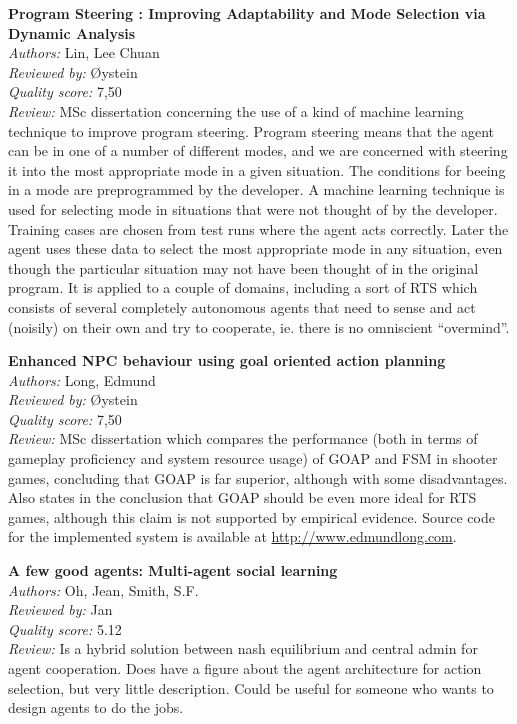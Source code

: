 {\textbf{Program Steering : Improving Adaptability and Mode Selection via Dynamic Analysis\cite{lin2004program}}\\
\textit{Authors:} Lin, Lee Chuan\\
\textit{Reviewed by:} {\O}ystein\\
\textit{Quality score:} 7,50\\
\textit{Review:} MSc dissertation concerning the use of a kind of machine learning technique to improve program steering. Program steering means that the agent can be in one of a number of different modes, and we are concerned with steering it into the most appropriate mode in a given situation. The conditions for beeing in a mode are preprogrammed by the developer. A machine learning technique is used for selecting mode in situations that were not thought of by the developer. Training cases are chosen from test runs where the agent acts correctly. Later the agent uses these data to select the most appropriate mode in any situation, even though the particular situation may not have been thought of in the original program. It is applied to a couple of domains, including a sort of RTS which consists of several completely autonomous agents that need to sense and act (noisily) on their own and try to cooperate, ie. there is no omniscient ``overmind''.

\textbf{Enhanced NPC behaviour using goal oriented action planning\cite{long2007enhanced}}\\
\textit{Authors:} Long, Edmund\\
\textit{Reviewed by:} {\O}ystein\\
\textit{Quality score:} 7,50\\
\textit{Review:} MSc dissertation which compares the performance (both in terms of gameplay proficiency and system resource usage) of GOAP and FSM in shooter games, concluding that GOAP is far superior, although with some disadvantages. Also states in the conclusion that GOAP should be even more ideal for RTS games, although this claim is not supported by empirical evidence. Source code for the implemented system is available at \url{http://www.edmundlong.com}.


\textbf{A few good agents: Multi-agent social learning\cite{Oh2008}}\\
\textit{Authors:} Oh, Jean, Smith, S.F.\\
\textit{Reviewed by:} Jan\\
\textit{Quality score:} 5.12\\
\textit{Review:} Is a hybrid solution between nash equilibrium and central admin for agent cooperation. Does have a figure about the agent architecture for action selection, but very little description. Could be useful for someone who wants to design agents to do the jobs.

}
